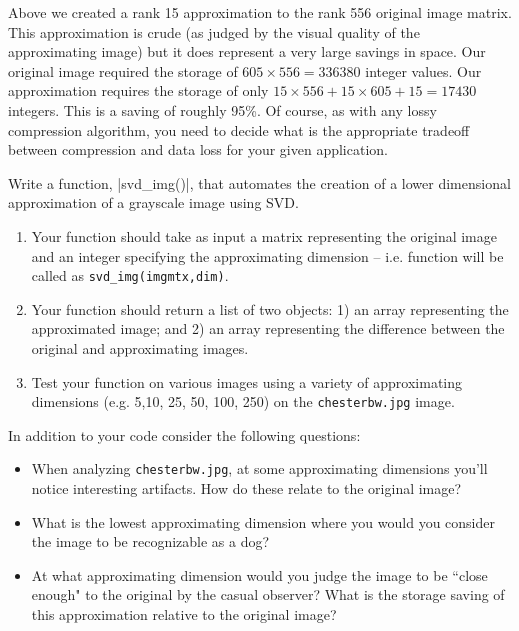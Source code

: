 Above we created a rank 15 approximation to the rank 556 original image matrix. This approximation is crude (as judged by the visual quality of the approximating image) but it does represent a very large savings in space. Our original image required the storage of $605 \times 556 = 336380$ integer values. Our approximation requires the storage of only $15 \times 556 + 15 \times 605 + 15 = 17430$ integers. This is a saving of roughly 95\%. Of course, as with any lossy compression algorithm, you need to decide what is the appropriate tradeoff between compression and data loss for your given application.


\begin{assignment}

Write a function, |svd_img()|, that automates the creation of a lower dimensional approximation of a grayscale image using SVD.

\begin{enumerate}
  \item Your function should take as input a matrix representing the original image and an integer specifying the approximating dimension -- i.e. function will be called as \verb|svd_img(imgmtx,dim)|.

  \item Your function should return a list of two objects: 1) an array representing the approximated image; and 2) an array representing the difference between the original and approximating images.

  \item Test your function on various images using a variety of approximating dimensions (e.g. 5,10, 25, 50, 100, 250) on the \verb|chesterbw.jpg| image.
\end{enumerate}


In addition to your code consider the following questions:

\begin{itemize}
\item When analyzing \texttt{chesterbw.jpg}, at some approximating dimensions you'll notice interesting artifacts. How do these relate to the original image?

\item What is the lowest approximating dimension where you would you consider the image to be recognizable as a dog?

\item At what approximating dimension would you judge the  image to be ``close enough"  to the original by the casual observer? What is the storage saving of this approximation relative to the original image?

\end{itemize}


\end{assignment}





